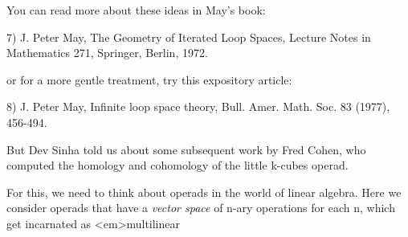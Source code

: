 You can read more about these ideas in May's book:

7) J. Peter May, The Geometry of Iterated Loop Spaces, 
Lecture Notes in Mathematics 271, Springer, Berlin, 1972.

or for a more gentle treatment, try this expository article:

8) J. Peter May, Infinite loop space theory, Bull. Amer. Math. 
Soc. 83 (1977), 456-494.

But Dev Sinha told us about some subsequent work by Fred 
Cohen, who computed the homology and cohomology of the little
k-cubes operad.

For this, we need to think about operads in the world of linear 
algebra.  Here we consider operads that have a \emph{vector space} of 
n-ary operations for each n, which get incarnated as <em>multilinear


